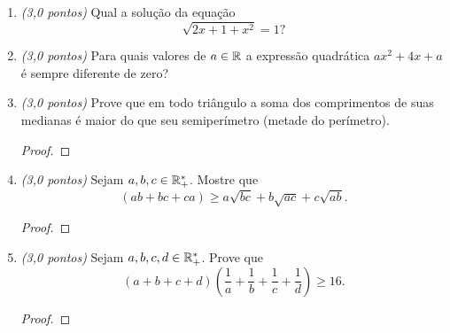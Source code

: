 \documentclass[12pt]{article}
\begin{document}
\begin{enumerate}
           Sabendo que uma duodécima parte é uma divisão por doze avos, quantos anos viveu
           Diofanto?
           \begin{solution}
           \end{solution}

     \item \emph{(3{,}0 pontos)} Qual a solução da equação $$\sqrt{2x + 1 + x^2} = 1?$$
           \begin{solution}
           \end{solution}

     \item \emph{(3{,}0 pontos)} Para quais valores de $a \in \mathbb R$ a expressão quadrática $ax^2 +4x + a$ é sempre diferente de zero?
           \begin{solution}
           \end{solution}

     \item \emph{(3{,}0 pontos)} Prove que em todo triângulo a soma dos comprimentos de suas medianas é maior do que seu semiperímetro (metade do perímetro).
           \begin{proof}
           \end{proof}

     \item \emph{(3{,}0 pontos)} Sejam $a, b, c \in \mathbb R_+^\ast$. Mostre que $$(ab + bc+ ca) \geq a \sqrt{bc} + b \sqrt{ac} + c \sqrt{ab}.$$
           \begin{proof}
           \end{proof}

     \item \emph{(3{,}0 pontos)} Sejam $a, b, c, d \in \mathbb R_+^\ast$. Prove que $$\left(a+b+c+d\right) \left( \dfrac 1 a + \dfrac 1 b + \dfrac 1 c + \dfrac 1 d \right) \geq 16.$$
           \begin{proof}
           \end{proof}

\end{enumerate}
\end{document}
